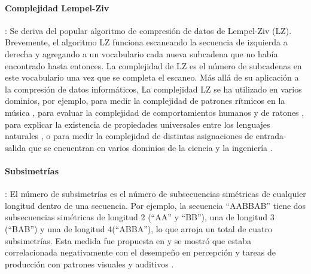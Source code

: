 \paragraph{Complejidad Lempel-Ziv}: Se deriva del popular algoritmo de compresión de datos de Lempel-Ziv (LZ)\cite{f98}. Brevemente, el algoritmo LZ funciona escaneando la secuencia de izquierda a derecha y agregando a un vocabulario cada nueva subcadena que no había encontrado hasta entonces. La complejidad de LZ es el número de subcadenas en este vocabulario una vez que se completa el escaneo. Más allá de su aplicación a la compresión de datos informáticos, La complejidad LZ se ha utilizado en varios dominios, por ejemplo, para medir la complejidad de patrones rítmicos en la música \cite{f61}, para evaluar la complejidad de comportamientos humanos \cite{f99} y de ratones \cite{f100}, para explicar la existencia de propiedades universales entre los lenguajes naturales \cite{f101}, o para medir la complejidad de distintas asignaciones de entrada-salida que se encuentran en varios dominios de la ciencia y la ingeniería \cite{f102,f103}.


\paragraph{Subsimetrías}: El número de subsimetrías es el número de subsecuencias simétricas de cualquier longitud dentro de una secuencia. Por ejemplo, la secuencia ``AABBAB'' tiene dos subsecuencias simétricas de longitud 2 (``AA'' y ``BB''), una de longitud 3 (``BAB'') y una de longitud 4(``ABBA''), lo que arroja un total de cuatro subsimetrías. Esta medida fue propuesta en \cite{f94} y se mostró que estaba correlacionada negativamente con el desempeño en percepción y tareas de producción con patrones visuales y auditivos \cite{f94,f104}.


